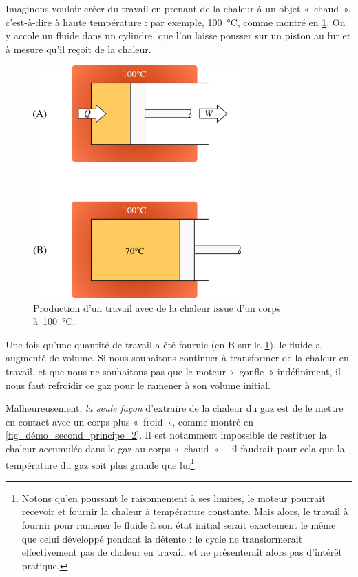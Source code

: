 		Imaginons vouloir créer du travail en prenant de la chaleur à un objet «~chaud~», c’est-à-dire à haute température : par exemple, \SI{100}{\degreeCelsius}, comme montré en \cref{fig_démo_second_principe_1}. On y accole un fluide dans un cylindre, que l’on laisse pousser sur un piston au fur et à mesure qu’il reçoit de la chaleur.

		\begin{figure}
			\begin{center}
				\includegraphics[width=8cm]{images/demo_second_principe_1.png}
			\end{center}
			\caption{Production d’un travail avec de la chaleur issue d’un corps à~\SI{100}{\degreeCelsius}.}
			\label{fig_démo_second_principe_1}
		\end{figure}

		Une fois qu’une quantité de travail a été fournie (en B sur la \cref{fig_démo_second_principe_1}), le fluide a augmenté de volume. Si nous souhaitons continuer à transformer de la chaleur en travail, et que nous ne souhaitons pas que le moteur «~gonfle~» indéfiniment, il nous faut refroidir ce gaz pour le ramener à son volume initial.

		Malheureusement, \emph{la seule façon} d’extraire de la chaleur du gaz est de le mettre en contact avec un corps plus «~froid~», comme montré en \cref{fig_démo_second_principe_2}. Il est notamment impossible de restituer la chaleur accumulée dans le gaz au corps «~chaud~» --\ il faudrait pour cela que la température du gaz soit plus grande que lui\footnote{Notons qu’en poussant le raisonnement à ses limites, le moteur pourrait recevoir et fournir la chaleur à température constante. Mais alors, le travail à fournir pour ramener le fluide à son état initial serait exactement le même que celui développé pendant la détente : le cycle ne transformerait effectivement pas de chaleur en travail, et ne présenterait alors pas d’intérêt pratique.}\nolinebreak.

